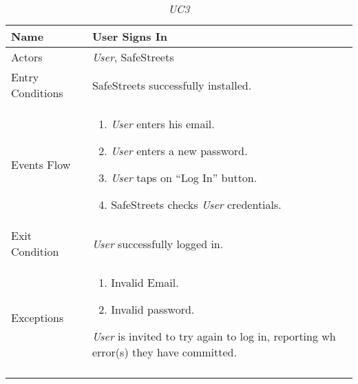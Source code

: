 \documentclass[../../../RASD.tex]{subfiles}
\begin{document}
    \newpage
    \begin{center}
        \begin{longtable}{| p{.35\linewidth} | p{.65\linewidth} |}
            \hline
            \textbf{Name} & \textbf{User Signs In}\\ \hline
            Actors & \textit{User}, SafeStreets\\ \hline
            Entry Conditions & SafeStreets successfully installed.\\ \hline
            Events Flow &
            \begin{enumerate}
                \item \textit{User} enters his email.
                \item \textit{User} enters a new password.
                \item \textit{User} taps on “Log In” button.
                \item SafeStreets checks \textit{User} credentials.
            \end{enumerate}
            \\ \hline
            Exit Condition & \textit{User} successfully logged in.\\ \hline
            Exceptions &
            \begin{enumerate}
                \item Invalid Email.
                \item Invalid password.
            \end{enumerate}
            \textit{User} is invited to try again to log in, reporting wh error(s) they have committed. \\
            \hline
            \caption[\textit{Use Case 3}]{\textit{UC3}}
        \end{longtable}
    \end{center}
    \newpage
\end{document}
